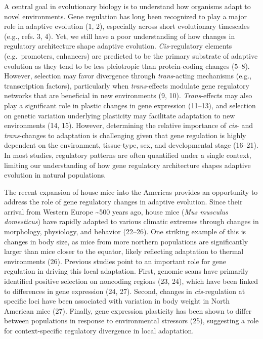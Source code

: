 \documentclass[9pt,twocolumn,twoside,lineno]{pnas-new}
\begin{document}
A central goal in evolutionary biology is to understand how organisms
adapt to novel environments. Gene regulation has long been recognized to
play a major role in adaptive evolution (1, 2), especially across short
evolutionary timescales (e.g., refs. 3, 4). Yet, we still have a poor
understanding of how changes in regulatory architecture shape adaptive
evolution. \emph{Cis}-regulatory elements (e.g.~promoters, enhancers)
are predicted to be the primary substrate of adaptive evolution as they
tend to be less pleiotropic than protein-coding changes (5--8). However,
selection may favor divergence through \emph{trans}-acting mechanisms
(e.g., transcription factors), particularly when \emph{trans}-effects
modulate gene regulatory networks that are beneficial in new
environments (9, 10). \emph{Trans}-effects may also play a significant
role in plastic changes in gene expression (11--13), and selection on
genetic variation underlying plasticity may facilitate adaptation to new
environments (14, 15). However, determining the relative importance of
\emph{cis}- and \emph{trans}-changes to adaptation is challenging given
that gene regulation is highly dependent on the environment,
tissue-type, sex, and developmental stage (16--21). In most studies,
regulatory patterns are often quantified under a single context,
limiting our understanding of how gene regulatory architecture shapes
adaptive evolution in natural populations. \bigskip

The recent expansion of house mice into the Americas provides an
opportunity to address the role of gene regulatory changes in adaptive
evolution. Since their arrival from Western Europe \textasciitilde500
years ago, house mice (\emph{Mus musculus domesticus}) have rapidly
adapted to various climatic extremes through changes in morphology,
physiology, and behavior (22--26). One striking example of this is
changes in body size, as mice from more northern populations are
significantly larger than mice closer to the equator, likely reflecting
adaptation to thermal environments (26). Previous studies point to an
important role for gene regulation in driving this local adaptation.
First, genomic scans have primarily identified positive selection on
noncoding regions (23, 24), which have been linked to differences in
gene expression (24, 27). Second, changes in \emph{cis}-regulation at
specific loci have been associated with variation in body weight in
North American mice (27). Finally, gene expression plasticity has been
shown to differ between populations in response to environmental
stressors (25), suggesting a role for context-specific regulatory
divergence in local adaptation.
\end{document}
